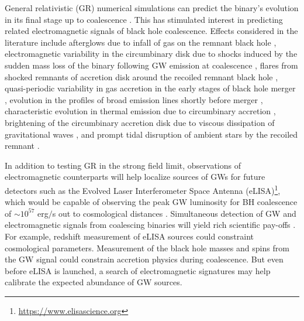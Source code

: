 \documentclass[a4paper,fleqn,usenatbib]{mnras}
\begin{document}
General relativistic (GR) numerical simulations can predict the
binary's evolution in its final stage up to coalescence
\citep{2005PhRvL..95l1101P, 2006PhRvL..96k1102B, 2006PhRvL..96k1101C}.
This has stimulated interest in predicting related electromagnetic
signals of black hole coalescence.  Effects considered in the
literature include afterglows due to infall of gas on the remnant
black hole \citep{2005ApJ...622L..93M}, electromagnetic variability in
the circumbinary disk due to shocks induced by the sudden mass loss of
the binary following GW emission at coalescence
\citep{2007APS..APR.S1010B, 2008ApJ...676L...5L}, flares from shocked
remnants of accretion disk around the recoiled remnant black hole
\citep{2007PhRvL..99d1103L, 2008ApJ...682..758S, 2009CQGra..26i4032H},
quasi-periodic variability in gas accretion in the early stages of
black hole merger \citep{2008ApJ...672...83M, 2009CQGra..26i4032H,
  2012MNRAS.427.2680K, 2013MNRAS.436.2997D, 2014ApJ...783..134F,
  2015ApJ...807..131S}, evolution in the profiles of broad emission
lines shortly before merger \citep{2013MNRAS.432.1468M},
characteristic evolution in thermal emission due to circumbinary
accretion \citep{2015MNRAS.446L..36F}, brightening of the circumbinary
accretion disk due to viscous dissipation of gravitational waves
\citep{2008PhRvL.101d1101K}, and prompt tidal disruption of ambient
stars by the recoiled remnant \citep{2011MNRAS.412...75S}.

In addition to testing GR in the strong field limit, observations of
electromagnetic counterparts will help localize sources of GWs for
future detectors such as the Evolved Laser Interferometer Space
Antenna (eLISA)\footnote{\url{https://www.elisascience.org}}, which
would be capable of observing the peak GW luminosity for BH
coalescence of $\sim 10^{57}$ erg$/$s out to cosmological distances
\citep{2003CQGra..20S..65H, 2013CQGra..30x4009S}.  Simultaneous
detection of GW and electromagnetic signals from coalescing binaries
will yield rich scientific pay-offs \citep{2003CQGra..20S..65H,
  2005ApJ...629...15H}.  For example, redshift measurement of eLISA
sources could constraint cosmological parameters.  Measurement of the
black hole masses and spins from the GW signal could constrain
accretion physics during coalescence.  But even before eLISA is
launched, a search of electromagnetic signatures may help calibrate
the expected abundance of GW sources.
\end{document}
